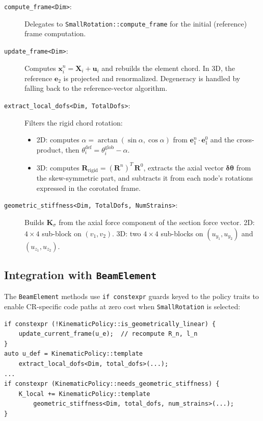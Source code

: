 \begin{description}
  \item[\texttt{compute\_frame<Dim>}:]
    Delegates to \texttt{SmallRotation::compute\_frame} for the
    initial (reference) frame computation.

  \item[\texttt{update\_frame<Dim>}:]
    Computes $\mathbf{x}_i^n = \mathbf{X}_i + \mathbf{u}_i$ and
    rebuilds the element chord.  In 3D, the reference $\mathbf{e}_2$
    is projected and renormalized.  Degeneracy is handled by falling
    back to the reference-vector algorithm.

  \item[\texttt{extract\_local\_dofs<Dim, TotalDofs>}:]
    Filters the rigid chord rotation:
    \begin{itemize}
      \item 2D: computes $\alpha = \arctan(\sin\alpha,\cos\alpha)$
            from $\mathbf{e}_1^n\cdot\mathbf{e}_1^0$ and the
            cross-product, then $\theta_i^{\text{def}} =
            \theta_i^{\text{glob}} - \alpha$.
      \item 3D: computes $\mathbf{R}_{\text{rigid}} =
            (\mathbf{R}^n)^T\,\mathbf{R}^0$, extracts the axial
            vector $\boldsymbol{\delta\theta}$ from the
            skew-symmetric part, and subtracts it from each node's
            rotations expressed in the corotated frame.
    \end{itemize}

  \item[\texttt{geometric\_stiffness<Dim, TotalDofs, NumStrains>}:]
    Builds $\mathbf{K}_\sigma$ from the axial force component of the
    section force vector.  2D: $4\times4$ sub-block on
    $(v_1,v_2)$.  3D: two $4\times4$ sub-blocks on $(u_{y_1},
    u_{y_2})$ and $(u_{z_1}, u_{z_2})$.
\end{description}

\subsection{Integration with \texttt{BeamElement}}

The \texttt{BeamElement} methods use \texttt{if constexpr} guards
keyed to the policy traits to enable CR-specific code paths at zero
cost when \texttt{SmallRotation} is selected:

\begin{verbatim}
if constexpr (!KinematicPolicy::is_geometrically_linear) {
    update_current_frame(u_e);  // recompute R_n, l_n
}
auto u_def = KinematicPolicy::template
    extract_local_dofs<Dim, total_dofs>(...);
...
if constexpr (KinematicPolicy::needs_geometric_stiffness) {
    K_local += KinematicPolicy::template
        geometric_stiffness<Dim, total_dofs, num_strains>(...);
}
\end{verbatim}


